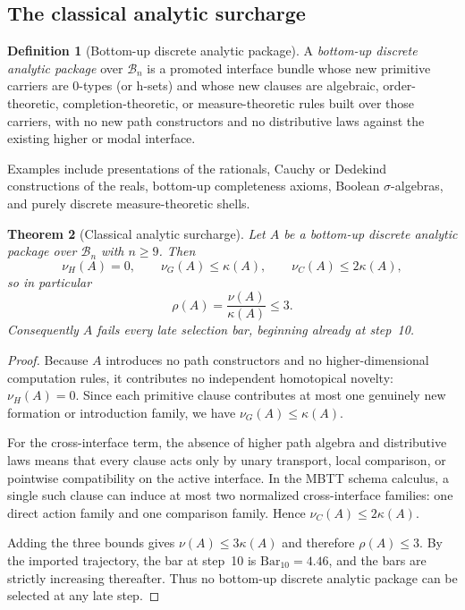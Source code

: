 \documentclass[11pt]{article}
\theoremstyle{plain}
\newtheorem{theorem}{Theorem}[section]
\theoremstyle{definition}
\newtheorem{definition}[theorem]{Definition}
\theoremstyle{remark}
\newcommand{\B}{\mathcal{B}}
\newcommand{\SelBar}{\mathrm{Bar}}
\begin{document}
\subsection{The classical analytic surcharge}

\begin{definition}[Bottom-up discrete analytic package]
\label{def:discrete-analytic}
A \emph{bottom-up discrete analytic package} over $\B_n$ is a promoted interface bundle whose new primitive carriers are $0$-types (or h-sets) and whose new clauses are algebraic, order-theoretic, completion-theoretic, or measure-theoretic rules built over those carriers, with no new path constructors and no distributive laws against the existing higher or modal interface.
\end{definition}

Examples include presentations of the rationals, Cauchy or Dedekind constructions of the reals, bottom-up completeness axioms, Boolean $\sigma$-algebras, and purely discrete measure-theoretic shells.

\begin{theorem}[Classical analytic surcharge]
\label{thm:analytic-surcharge}
Let $A$ be a bottom-up discrete analytic package over $\B_n$ with $n\ge 9$. Then
\[
  \nu_H(A)=0,
  \qquad
  \nu_G(A)\le \kappa(A),
  \qquad
  \nu_C(A)\le 2\kappa(A),
\]
so in particular
\[
  \rho(A)=\frac{\nu(A)}{\kappa(A)}\le 3.
\]
Consequently $A$ fails every late selection bar, beginning already at step~10.
\end{theorem}

\begin{proof}
Because $A$ introduces no path constructors and no higher-dimensional computation rules, it contributes no independent homotopical novelty: $\nu_H(A)=0$. Since each primitive clause contributes at most one genuinely new formation or introduction family, we have $\nu_G(A)\le \kappa(A)$.

For the cross-interface term, the absence of higher path algebra and distributive laws means that every clause acts only by unary transport, local comparison, or pointwise compatibility on the active interface. In the MBTT schema calculus, a single such clause can induce at most two normalized cross-interface families: one direct action family and one comparison family. Hence $\nu_C(A)\le 2\kappa(A)$.

Adding the three bounds gives $\nu(A)\le 3\kappa(A)$ and therefore $\rho(A)\le 3$. By the imported trajectory, the bar at step~10 is $\SelBar_{10}=4.46$, and the bars are strictly increasing thereafter. Thus no bottom-up discrete analytic package can be selected at any late step.
\end{proof}
\end{document}
